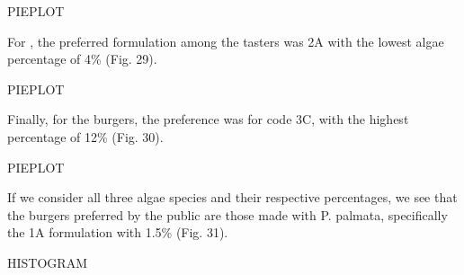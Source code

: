 PIEPLOT

For , the preferred formulation among the tasters was 2A with the lowest algae percentage of 4\% (Fig. 29).

PIEPLOT

Finally, for the  burgers, the preference was for code 3C, with the highest percentage of 12\% (Fig. 30).

PIEPLOT

If we consider all three algae species and their respective percentages, we see that the burgers preferred by the public are those made with P. palmata, specifically the 1A formulation with 1.5\% (Fig. 31).

HISTOGRAM
